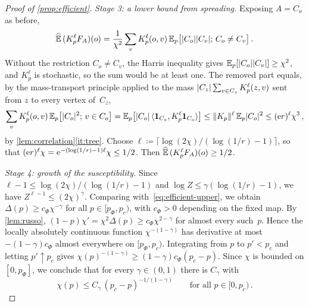 \begin{proof}[Proof of \cref{prop:efficient}]
\emph{Stage 3: a lower bound from spreading.} Exposing $A=C_o$ as before,
\begin{equation*}
  \widehat{\mathbb E}\,(K_p^\ell F_A)(o)=\frac1{\chi^2}\sum_vK_p^\ell(o,v)\,\mathbb E_p\bigl[\lvert C_o\rvert\lvert C_v\rvert;\,C_o\neq C_v\bigr]\,.
\end{equation*}
Without the restriction $C_o\neq C_v$, the Harris inequality gives
$\mathbb E_p[\lvert C_o\rvert\lvert C_v\rvert]\ge\chi^2$, and $K_p^\ell$ is stochastic, so the sum would be at least one. The
removed part equals, by the mass-transport principle applied to the mass
$\lvert C_z\rvert\sum_{v\in C_z}K_p^\ell(z,v)$ sent from $z$ to every vertex of~$C_z$,
\begin{equation*}
  \sum_vK_p^\ell(o,v)\,\mathbb E_p\bigl[\lvert C_o\rvert^2;\,v\in C_o\bigr]
  =\mathbb E_p\bigl[\lvert C_o\rvert\,\langle\mathbf{1}_{C_o},K_p^\ell\mathbf{1}_{C_o}\rangle\bigr]
  \le\lVert K_p\rVert^\ell\,\mathbb E_p\lvert C_o\rvert^2\le(\mathrm{e} r)^\ell\chi^3\,,
\end{equation*}
by \cref{lem:correlation}\ref{it:tree}. Choose $\ell\coloneqq\lceil\log(2\chi)/(\log(1/r)-1)\rceil$, so
that $(\mathrm{e} r)^\ell\chi=\mathrm{e}^{-(\log(1/r)-1)\ell}\chi\le1/2$. Then $\widehat{\mathbb E}\,(K_p^\ell F_A)(o)\ge1/2$.

\emph{Stage 4: growth of the susceptibility.} Since $\ell-1\le\log(2\chi)/(\log(1/r)-1)$ and
$\log Z\le\gamma(\log(1/r)-1)$, we have $Z^{\ell-1}\le(2\chi)^\gamma$. Comparing
with~\eqref{eq:efficient-upper}, we obtain $\Delta(p)\ge c_\Phi\chi^{-\gamma}$ for all $p\in[p_\Phi,p_c)$, with $c_\Phi>0$ depending on the fixed map. By \cref{lem:russo},
$(1-p)\chi'=\chi^2\Delta(p)\ge c_\Phi\chi^{2-\gamma}$ for almost every such~$p$. Hence the locally
absolutely continuous function $\chi^{-(1-\gamma)}$ has derivative at most $-(1-\gamma)c_\Phi$ almost
everywhere on $[p_\Phi,p_c)$. Integrating from $p$ to $p'<p_c$ and letting $p'\uparrow p_c$ gives
$\chi(p)^{-(1-\gamma)}\ge(1-\gamma)c_\Phi(p_c-p)$. Since $\chi$ is bounded on $[0,p_\Phi]$, we conclude
that for every $\gamma\in(0,1)$ there is $C_\gamma$ with
\begin{equation}\label{eq:efficient-chi}
  \chi(p)\le C_\gamma\,(p_c-p)^{-1/(1-\gamma)}\qquad\text{for all }p\in[0,p_c)\,.
\end{equation}


\end{proof}
